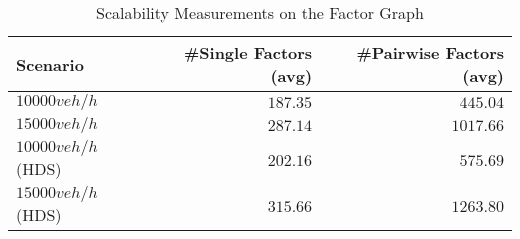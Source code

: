 \begin{table}[t]
  \centering
  
  \caption{Scalability Measurements on the Factor Graph}
  {
  \begin{tabular}{lrr}
  
  \hline
     Scenario & \#Single Factors (avg) &	\#Pairwise Factors (avg) \\ 
    \midrule
    $10000 veh/h$ &	$187.35$ &	$445.04$ \\
    $15000 veh/h$ &	$287.14$ &	$1017.66$ \\
    $10000 veh/h$ (HDS) &	$202.16$ &	$575.69$ \\
    $15000veh/h$ (HDS) &	$315.66$ &	$1263.80$ \\
    
  \end{tabular}
  }
  \label{tab:fg_scale}  
\end{table}
